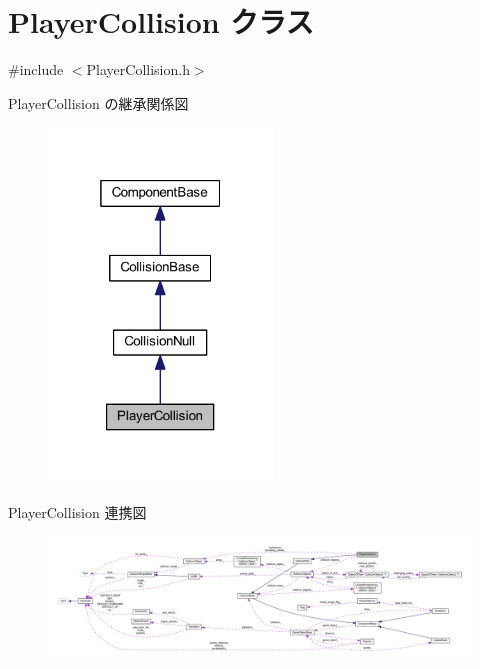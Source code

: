 \hypertarget{class_player_collision}{}\section{Player\+Collision クラス}
\label{class_player_collision}


{\ttfamily \#include $<$Player\+Collision.\+h$>$}



Player\+Collision の継承関係図\nopagebreak
\begin{figure}[H]
\begin{center}
\leavevmode
\includegraphics[width=169pt]{class_player_collision__inherit__graph}
\end{center}
\end{figure}


Player\+Collision 連携図\nopagebreak
\begin{figure}[H]
\begin{center}
\leavevmode
\includegraphics[width=350pt]{class_player_collision__coll__graph}
\end{center}
\end{figure}
